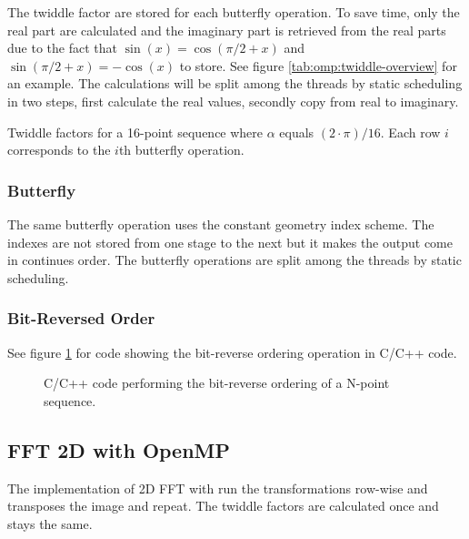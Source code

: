 The twiddle factor are stored for each butterfly operation. To save time, only the real part are calculated and the imaginary part is retrieved from the real parts due to the fact that $\sin(x) = \cos(\pi/2 + x)$ and $\sin(\pi/2 + x) = -\cos(x)$ to store. See figure \ref{tab:omp:twiddle-overview} for an example. The calculations will be split among the threads by static scheduling in two steps, first calculate the real values, secondly copy from real to imaginary.

\begin{table}
	\centering
	
	\caption{Twiddle factors for a 16-point sequence where $\alpha$ equals $(2 \cdot \pi) / 16$. Each row $i$ corresponds to the $i$th butterfly operation.}
	\label{tab:omp:twiddle-overview}
\end{table}

\subsubsection{Butterfly}

The same butterfly operation uses the constant geometry index scheme. The indexes are not stored from one stage to the next but it makes the output come in continues order. The butterfly operations are split among the threads by static scheduling.

\subsubsection{Bit-Reversed Order}

See figure \ref{fig:omp:bit-reverse-order} for code showing the bit-reverse ordering operation in C/C++ code.

\begin{figure}
	\centering
	\begin{framed}
			
	\end{framed}
	\caption{ C/C++ code performing the bit-reverse ordering of a N-point sequence. }
	\label{fig:omp:bit-reverse-order}
\end{figure}

\subsection{FFT 2D with OpenMP}

The implementation of \gls{2D} \gls{FFT} with {\OMP} run the transformations row-wise and transposes the image and repeat. The twiddle factors are calculated once and stays the same.

